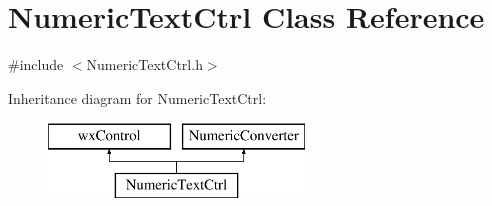 \hypertarget{class_numeric_text_ctrl}{}\section{Numeric\+Text\+Ctrl Class Reference}
\label{class_numeric_text_ctrl}


{\ttfamily \#include $<$Numeric\+Text\+Ctrl.\+h$>$}

Inheritance diagram for Numeric\+Text\+Ctrl\+:\begin{figure}[H]
\begin{center}
\leavevmode
\includegraphics[height=2.000000cm]{class_numeric_text_ctrl}
\end{center}
\end{figure}

